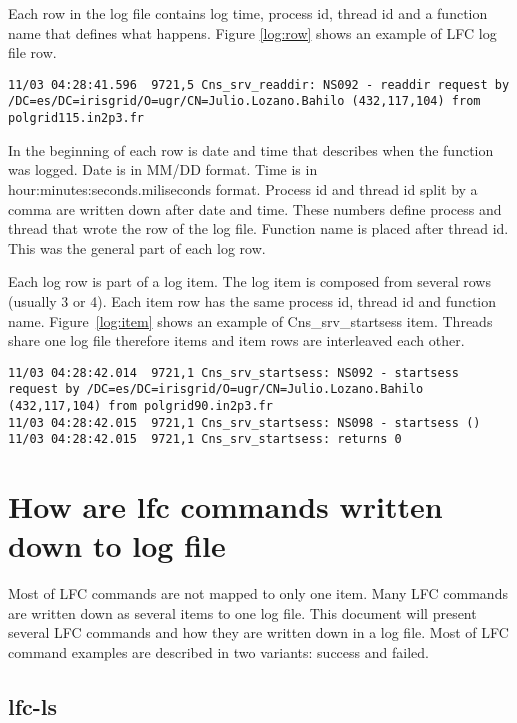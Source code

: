 \documentclass[a4paper, 11pt]{article} %
\begin{document}
Each row in the log file contains log time, process id, thread id and a function name that defines what happens. Figure \ref{log:row} shows an example of LFC log file row.

\begin{lstlisting}[label={log:row},caption={Cns\_srv\_startsess row example}, breaklines]
11/03 04:28:41.596  9721,5 Cns_srv_readdir: NS092 - readdir request by /DC=es/DC=irisgrid/O=ugr/CN=Julio.Lozano.Bahilo (432,117,104) from polgrid115.in2p3.fr
\end{lstlisting}

In the beginning of each row is date and time that describes when the function was logged. Date is in MM/DD format. Time is in hour:minutes:seconds.miliseconds format. Process id and thread id split by a comma are written down after date and time. These numbers define process and thread that wrote the row of the log file. Function name is placed after thread id. This was the general part of each log row.

Each log row is part of a log item. The log item is composed from several rows (usually 3 or 4). Each item row has the same process id, thread id and function name. Figure~\ref{log:item} shows an example of Cns\_srv\_startsess item. Threads share one log file therefore items and item rows are interleaved each other.


\begin{lstlisting}[label={log:item},caption={Cns\_srv\_startsess}]
11/03 04:28:42.014  9721,1 Cns_srv_startsess: NS092 - startsess request by /DC=es/DC=irisgrid/O=ugr/CN=Julio.Lozano.Bahilo (432,117,104) from polgrid90.in2p3.fr
11/03 04:28:42.015  9721,1 Cns_srv_startsess: NS098 - startsess ()
11/03 04:28:42.015  9721,1 Cns_srv_startsess: returns 0
\end{lstlisting}

\newpage

\section{How are lfc commands written down to log file}

Most of LFC commands are not mapped to only one item. Many LFC commands are written down as several items to one log file. This document will present several LFC commands and how they are written down in a log file. Most of LFC command examples are described in two variants: success and failed.

\subsection{lfc-ls}
\end{document}
